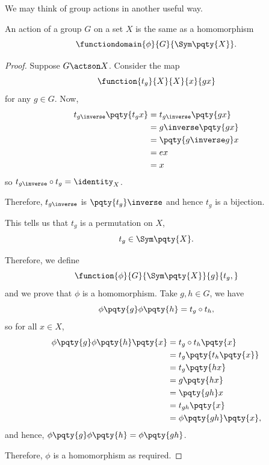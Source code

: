 We may think of group actions in another useful way.

\begin{theorem}
    \label{thm:action-homomorphism}%
    An action of a group \(G\) on a set \(X\) is the same as a homomorphism
    \[
        \functiondomain{\phi}{G}{\Sym\pqty{X}}.
    \]
\end{theorem}

\begin{proof}
    Suppose \(G \actson X\). Consider the map
    \[
        \function{t_g}{X}{X}{x}{gx}
    \]
    for any \(g \in G\). Now,
    \begin{align*}
        t_{g\inverse} \pqty{t_g x} &= t_{g\inverse} \pqty{gx} \\
        &= g\inverse \pqty{gx} \\
        &= \pqty{g\inverse g} x \\
        &= ex \\
        &= x
    \end{align*}
    so \(t_{g\inverse} \circ t_g = \identity_{X}\).

    Therefore, \(t_{g\inverse}\) is \(\pqty{t_g}\inverse\) and hence \(t_g\) is a bijection.

    This tells us that \(t_g\) is a permutation on \(X\),
    \[
        t_g \in \Sym\pqty{X}.
    \]

    Therefore, we define
    \[
        \function{\phi}{G}{\Sym\pqty{X}}{g}{t_{g},}
    \]
    and we prove that \(\phi\) is a homomorphism. Take \(g, h \in G\), we have
    \[
        \phi\pqty{g} \phi\pqty{h} = t_g \circ t_h,
    \]
    so for all \(x \in X\),
    \begin{align*}
        \phi\pqty{g} \phi\pqty{h} \pqty{x} &= t_g \circ t_h \pqty{x} \\
        &= t_g \pqty{t_h \pqty{x}} \\
        &= t_g \pqty{hx} \\
        &= g \pqty{hx} \\
        &= \pqty{gh} x \\
        &= t_{gh} \pqty{x} \\
        &= \phi\pqty{gh} \pqty{x},
    \end{align*}
    and hence, \(\phi\pqty{g} \phi\pqty{h} = \phi\pqty{gh}\).

    Therefore, \(\phi\) is a homomorphism as required.


\end{proof}
